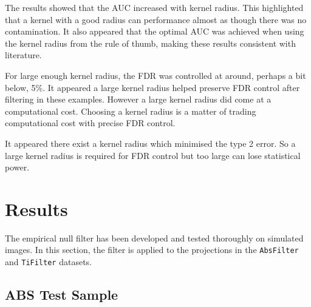 The results showed that the AUC increased with kernel radius. This highlighted that a kernel with a good radius can performance almost as though there was no contamination. It also appeared that the optimal AUC was achieved when using the kernel radius from the rule of thumb, making these results consistent with literature.

For large enough kernel radius, the FDR was controlled at around, perhaps a bit below, 5\%. It appeared a large kernel radius helped preserve FDR control after filtering in these examples. However a large kernel radius did come at a computational cost. Choosing a kernel radius is a matter of trading computational cost with precise FDR control.

It appeared there exist a kernel radius which minimised the type 2 error. So a large kernel radius is required for FDR control but too large can lose statistical power.

\afterpage{\clearpage}
\section{Results}
The empirical null filter has been developed and tested thoroughly on simulated images. In this section, the filter is applied to the projections in the \texttt{AbsFilter} and \texttt{TiFilter} datasets.

\subsection{ABS Test Sample}

